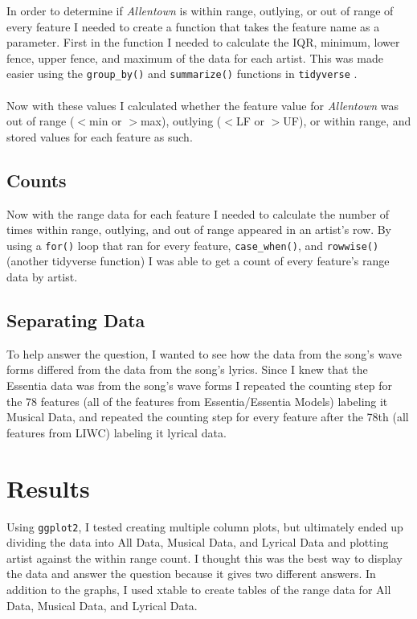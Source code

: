 \documentclass{article}\usepackage[]{graphicx}\usepackage[]{xcolor}
\begin{document}
\begin{multicols}{2}
In order to determine if \emph{Allentown} is within range, outlying, or out of range of every feature I needed to create a function that takes the feature name as a parameter. First in the function I needed to calculate the IQR, minimum, lower fence, upper fence, and maximum of the data for each artist. This was made easier using the \texttt{group\_by()} and \texttt{summarize()} functions in \texttt{tidyverse} \citep{tidyverse}.
\\ \\
Now with these values I calculated whether the feature value for \emph{Allentown} was out of range ($<$min or $>$max), outlying ($<$LF or $>$UF), or within range, and stored values for each feature as such.

\columnbreak

\subsection{Counts}

Now with the range data for each feature I needed to calculate the number of times within range, outlying, and out of range appeared in an artist's row. By using a \texttt{for()} loop that ran for every feature, \texttt{case\_when()}, and \texttt{rowwise()} (another tidyverse function) I was able to get a count of every feature's range data by artist.

\subsection{Separating Data}

To help answer the question, I wanted to see how the data from the song's wave forms differed from the data from the song's lyrics. Since I knew that the Essentia data was from the song's wave forms I repeated the counting step for the 78 features (all of the features from Essentia/Essentia Models) labeling it Musical Data, and repeated the counting step for every feature after the 78th (all features from LIWC) labeling it lyrical data.


\section{Results}

Using \texttt{ggplot2}, \citep{ggplot2} I tested creating multiple column plots, but ultimately ended up dividing the data into All Data, Musical Data, and Lyrical Data and plotting artist against the within range count. I thought this was the best way to display the data and answer the question because it gives two different answers. In addition to the graphs, I used xtable \citep{xtable} to create tables of the range data for All Data, Musical Data, and Lyrical Data.


\end{multicols}
\end{document}
